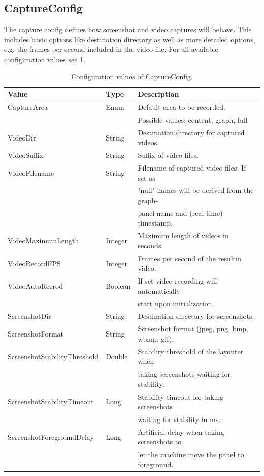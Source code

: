 \subsection{CaptureConfig}
\label{ss:captureConfig}
The capture config defines how screenshot and video captures will behave. This includes basic options like destination directory as well as more detailed options, e.g. the frames-per-second included in the video file. For all available configuration values see \ref{tab:captureConfigValues}.

\begin{table}[h]
\centering
\begin{tabular}[h]{|l|l|l|}\hline
	\textbf{Value} & \textbf{Type} & \textbf{Description}\\
	\hline
	CaptureArea & Enum & Default area to be recorded.\\
	& & Possible values: content, graph, full\\
	\hline
	VideoDir & String & Destination directory for captured videos.\\
	\hline
	VideoSuffix & String & Suffix of video files.\\
	\hline
	VideoFilename & String & Filename of captured video files. If set as\\
	& & "null" names will be derived from the graph-\\
	& & panel name and (real-time) timestamp.\\
	\hline
	VideoMaximumLength & Integer & Maximum length of videos in seconds.\\
	\hline
	VideoRecordFPS & Integer & Frames per second of the resultin video.\\
	\hline
	VideoAutoRecrod & Boolean & If set video recording will automatically\\
	& & start upon initialization.\\
	\hline
	ScreenshotDir & String & Destination directory for screenshots.\\
	\hline
	ScreenshotFormat & String & Screenshot format (jpeg, png, bmp, wbmp, gif).\\
	\hline
	ScreenshotStabilityThreshold & Double & Stability threshold of the layouter when\\
	& & taking screenshots waiting for stability.\\
	\hline
	ScreenshotStabilityTimeout & Long & Stability timeout for taking screenshots\\
	& & waiting for stability in ms.\\
	\hline
	ScreenshotForegroundDelay & Long & Artificial delay when taking screenshots to\\
	& & let the machine move the panel to foreground.\\
	\hline
\end{tabular}
\caption{Configuration values of CaptureConfig.}
\label{tab:captureConfigValues}
\end{table}

